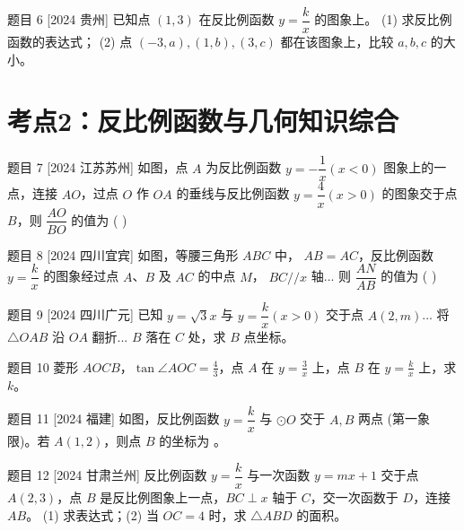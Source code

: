 \documentclass[12pt, a4paper]{article}
\begin{document}
\begin{problem}{题目 6 [2024 贵州]}
已知点 $(1,3)$ 在反比例函数 $y=\dfrac{k}{x}$ 的图象上。
(1) 求反比例函数的表达式；
(2) 点 $(-3, a), (1, b), (3, c)$ 都在该图象上，比较 $a, b, c$ 的大小。
\end{problem}
\vspace{2cm}

\section*{考点2：反比例函数与几何知识综合}

\begin{problem}{题目 7 [2024 江苏苏州]}
如图，点 $A$ 为反比例函数 $y=-\dfrac{1}{x} (x<0)$ 图象上的一点，连接 $AO$，过点 $O$ 作 $OA$ 的垂线与反比例函数 $y=\dfrac{4}{x} (x>0)$ 的图象交于点 $B$，则 $\dfrac{AO}{BO}$ 的值为 ( \quad )
\end{problem}
\vspace{2cm}

\begin{problem}{题目 8 [2024 四川宜宾]}
如图，等腰三角形 $ABC$ 中， $AB=AC$，反比例函数 $y=\dfrac{k}{x}$ 的图象经过点 $A$、$B$ 及 $AC$ 的中点 $M$， $BC // x$ 轴... 则 $\dfrac{AN}{AB}$ 的值为 ( \quad )
\end{problem}
\vspace{2cm}

\begin{problem}{题目 9 [2024 四川广元]}
已知 $y=\sqrt{3}x$ 与 $y=\dfrac{k}{x}(x>0)$ 交于点 $A(2, m)$... 将 $\triangle OAB$ 沿 $OA$ 翻折... $B$ 落在 $C$ 处，求 $B$ 点坐标。
\end{problem}
\vspace{3cm}

\begin{problem}{题目 10}
菱形 $AOCB$，$\tan \angle AOC = \frac{4}{3}$，点 $A$ 在 $y=\frac{3}{x}$ 上，点 $B$ 在 $y=\frac{k}{x}$ 上，求 $k$。
\end{problem}
\vspace{2cm}

\begin{problem}{题目 11 [2024 福建]}
如图，反比例函数 $y=\dfrac{k}{x}$ 与 $\odot O$ 交于 $A, B$ 两点 (第一象限)。若 $A(1,2)$，则点 $B$ 的坐标为 \underline{\hspace{2cm}}。
\end{problem}
\vspace{2cm}

\begin{problem}{题目 12 [2024 甘肃兰州]}
反比例函数 $y=\dfrac{k}{x}$ 与一次函数 $y=mx+1$ 交于点 $A(2,3)$，点 $B$ 是反比例图象上一点，$BC \perp x$ 轴于 $C$，交一次函数于 $D$，连接 $AB$。
(1) 求表达式；(2) 当 $OC=4$ 时，求 $\triangle ABD$ 的面积。
\end{problem}
\vspace{4cm}
\end{document}
